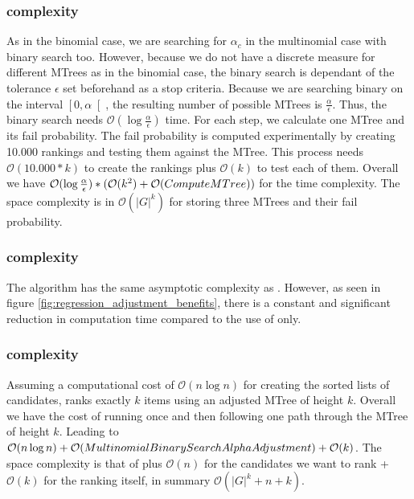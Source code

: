 \subsubsection{\algoMultBinary complexity}\label{subsubsec:mtree-complexity}
As in the binomial case, we are searching for $\alpha_c$ in the multinomial case with binary search too. However, because we do not have a discrete measure for different MTrees as in the binomial case, the binary search is dependant of the tolerance $\epsilon$ set beforehand as a stop criteria. Because we are searching binary on the interval $\left[0,\alpha\right[$, the resulting number of possible MTrees is $\frac{\alpha}{\epsilon}$. Thus, the binary search needs $\mathcal{O}(\log{}\frac{\alpha}{\epsilon})$ time. For each step, we calculate one MTree and its fail probability. The fail probability is computed experimentally by creating 10.000 rankings and testing them against the MTree. This process needs $\mathcal{O}(10.000 *k)$ to create the rankings plus $\mathcal{O}(k)$ to test each of them. Overall we have $\mathcal{O}(\log{}\frac{\alpha}{\epsilon}) * (\mathcal{O}(k^2) + \mathcal{O}({\sc ComputeMTree}))$ for the time complexity. The space complexity is in $\mathcal{O}(|G|^k)$ for storing three MTrees and their fail probability.
\subsubsection{\algoReg complexity}\label{subsubsec:regression-complexity}
The algorithm \algoReg has the same asymptotic complexity as \algoMultBinary . However, as seen in figure \ref{fig:regression_adjustment_benefits}, there is a constant and significant reduction in computation time compared to the use of \algoMultBinary only.
\subsubsection{\algoFAIR complexity}\label{subsubsec:FAIR-complexity}
Assuming a computational cost of $\mathcal{O}(n \log{} n)$ for creating the sorted lists of candidates, \algoFAIR ranks exactly $k$ items using an adjusted MTree of height $k$. Overall we have the cost of running \algoMultBinary once and then following one path through the MTree of height $k$. Leading to $\mathcal{O}(n \log{} n) + \mathcal{O} ({\sc MultinomialBinarySearchAlphaAdjustment}) + \mathcal{O}(k)$. The space complexity is that of \algoMultBinary plus $\mathcal{O}(n)$ for the candidates we want to rank + $\mathcal{O}(k)$ for the ranking itself, in summary $\mathcal{O}(|G|^k + n + k)$.

